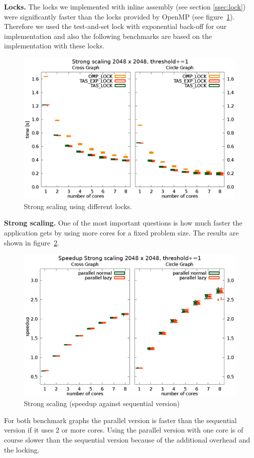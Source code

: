 \documentclass[letterpaper]{article}
\newcommand{\mypar}[1]{{\bf #1.}}
\begin{document}
\mypar{Locks}
The locks we implemented with inline assembly (see section \ref{ssec:lock}) were significantly faster than the locks provided by OpenMP (see figure~\ref{fig:lock_bench}). Therefore we used the test-and-set lock with exponential back-off for our implementation and also the following benchmarks are based on the implementation with these locks.

\begin{figure}[h]\centering
  \includegraphics[scale=0.558]{lock_benchmark.eps}
  \caption{Strong scaling using different locks.\label{fig:lock_bench}}
\end{figure}


\mypar{Strong scaling}
One of the most important questions is how much faster the application gets by using more cores for a fixed problem size. The results are shown in figure~\ref{fig:strong_scaling}.
\begin{figure}[h]\centering
  \includegraphics[scale=0.558]{strong_scaling_speedup.eps}
  \caption{Strong scaling (speedup against sequential version) \label{fig:strong_scaling}}
\end{figure}
For both benchmark graphs the parallel version is faster than the sequential version if it uses 2 or more cores. Using the parallel version with one core is of course slower than the sequential version  because of the additional overhead and the locking.
\end{document}
